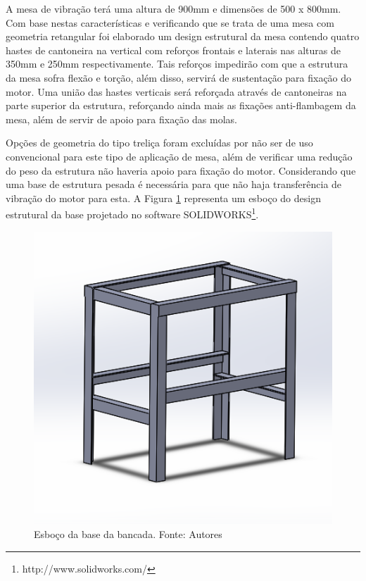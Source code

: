    A mesa de vibração terá uma altura de 900mm e dimensões de 500 x 800mm. Com base nestas características e verificando que se trata de uma mesa com geometria retangular foi elaborado um design estrutural da mesa contendo quatro hastes de cantoneira na vertical com reforços frontais e laterais nas alturas de 350mm e 250mm respectivamente. Tais reforços impedirão com que a estrutura da mesa sofra flexão e torção, além disso, servirá de sustentação para fixação do motor. Uma união das hastes verticais será reforçada através de cantoneiras na parte superior da estrutura, reforçando ainda mais as fixações anti-flambagem da mesa, além de servir de apoio para fixação das molas.

    Opções de geometria do tipo treliça foram excluídas por não ser de uso convencional para este tipo de aplicação de mesa, além de verificar uma redução do peso da estrutura não haveria apoio para fixação do motor. Considerando que uma base de estrutura pesada é necessária para que não haja transferência de vibração do motor para esta. A Figura \ref{fig:base_bancada} representa um esboço do design estrutural da base projetado no software SOLIDWORKS\footnote{http://www.solidworks.com/}.

\begin{figure}[H]
\centering
\includegraphics[scale=0.5]{figuras/base_bancada.png}
\caption{Esboço da base da bancada. Fonte: Autores}
\label{fig:base_bancada}
\end{figure}

